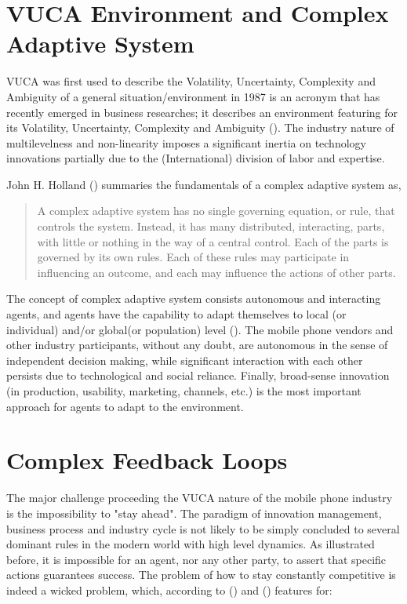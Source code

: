 \documentclass[utf8,english]{gradu3}
\begin{document}
\section{VUCA Environment and Complex Adaptive System}

VUCA was first used to describe the Volatility, Uncertainty, Complexity and Ambiguity of a general situation/environment in 1987 is an acronym that has recently emerged in business researches; it describes an environment featuring for its Volatility, Uncertainty, Complexity and Ambiguity (\cite{bennett2014difference}). The industry nature of multilevelness and non-linearity imposes a significant inertia on technology innovations partially due to the (International) division of labor and expertise.

John H. Holland (\citeyear{holland1992complex}) summaries the fundamentals of a complex adaptive system as,

\begin{quote}
A complex adaptive system has no single governing equation, or rule, that controls the system. Instead, it has many distributed, interacting, parts, with little or nothing in the way of a central control. Each of the parts is governed by its own rules. Each of these rules may participate in influencing an outcome, and each may influence the actions of other parts.
\end{quote}

The concept of complex adaptive system consists autonomous and interacting agents, and agents have the capability to adapt themselves to local (or individual) and/or global(or population) level (\cite{macal2010tutorial}). The mobile phone vendors and other industry participants, without any doubt, are autonomous in the sense of independent decision making, while significant interaction with each other persists due to technological and social reliance. Finally, broad-sense innovation (in production, usability, marketing, channels, etc.) is the most important approach for agents to adapt to the environment.

\section{Complex Feedback Loops}

The major challenge proceeding the VUCA nature of the mobile phone industry is the impossibility to "stay ahead". The paradigm of innovation management, business process and industry cycle is not likely to be simply concluded to several dominant rules in the modern world with high level dynamics. As illustrated before, it is impossible for an agent, nor any other party, to assert that specific actions guarantees success. The problem of how to stay constantly competitive is indeed a wicked problem, which, according to \citeauthor{rittel1974wicked} (\citeyear{rittel1974wicked}) and \citeauthor{buchanan1992wicked} (\citeyear{buchanan1992wicked}) features for:
\end{document}
